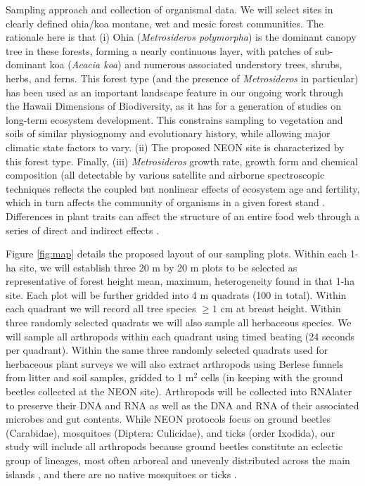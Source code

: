 \documentclass[11pt]{article}
\makeatletter
\renewcommand{\paragraph}{\@startsection{paragraph}{4}{\z@}
  {1ex \@plus 1ex \@minus .2ex}{-1em}
  {\normalfont\normalsize\it}
}
\makeatother
\begin{document}
\paragraph{Sampling approach and collection of organismal data.}
We will select sites in clearly defined ohia/koa montane, wet and
mesic forest communities. The rationale here is that (i) Ohia
({\it Metrosideros polymorpha}) is the dominant canopy tree in these
forests, forming a nearly continuous layer, with patches of
sub-dominant koa ({\it Acacia koa}) and numerous associated understory
trees, shrubs, herbs, and ferns. This forest type (and the presence of
{\it Metrosideros} in particular) has been used as an important landscape
feature in our ongoing work through the Hawaii Dimensions of
Biodiversity, as it has for a generation of studies on long-term
ecosystem development. This constrains sampling to vegetation and
soils of similar physiognomy and evolutionary history, while allowing
major climatic state factors to vary. (ii) The proposed NEON site is
characterized by this forest type. Finally, (iii) {\it Metrosideros} growth
rate, growth form and chemical composition (all detectable by various
satellite and airborne spectroscopic techniques \citep{asner2006,
  asner2009, asner2012} reflects the coupled but nonlinear effects of
ecosystem age and fertility, which in turn affects the community of
organisms in a given forest stand \citep{crews1995,
  gruner2007}. Differences in plant traits can affect the structure of
an entire food web through a series of direct and indirect effects
\citep{gruner2005, bukovinszky2008}.

Figure \ref{fig:map} details the proposed layout of our sampling
plots. Within each 1-ha site, we will establish three 20 m by 20 m
plots to be selected as representative of forest height mean, maximum,
heterogeneity found in that 1-ha site. Each plot will be further
gridded into 4 m quadrats (100 in total).  Within each quadrant we
will record all tree species $\geq 1$ cm at breast height.  Within
three randomly selected quadrats we will also sample all herbaceous
species.  We will sample all arthropods within each quadrant using
timed beating (24 seconds per quadrant).  Within the same three
randomly selected quadrats used for herbaceous plant surveys we will
also extract arthropods using Berlese funnels from litter and soil
samples, gridded to 1 m$^2$ cells (in keeping with the ground beetles
collected at the NEON site).  Arthropods will be collected into
RNAlater to preserve their DNA and RNA as well as the DNA and RNA of
their associated microbes and gut contents.  While NEON protocols
focus on ground beetles (Carabidae), mosquitoes (Diptera: Culicidae),
and ticks (order Ixodida), our study will include all arthropods
because ground beetles constitute an eclectic group of lineages, most
often arboreal and unevenly distributed across the main islands
\citep{Liebherr2000}, and there are no native mosquitoes or ticks
\citep{nishida2002}.
\end{document}
